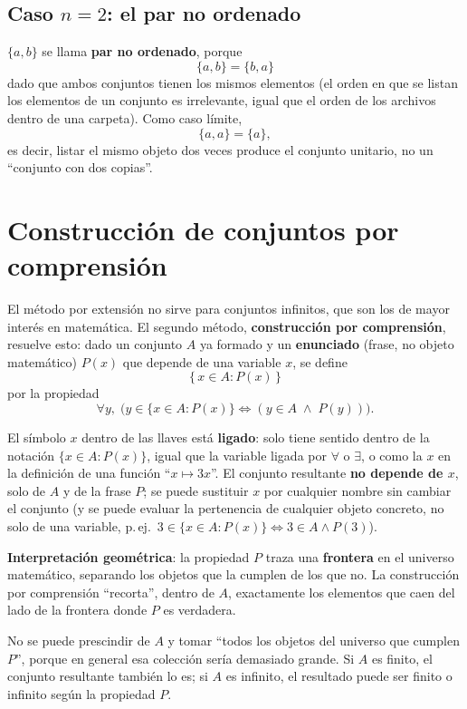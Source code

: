 \documentclass[12pt,a4paper]{article}
\begin{document}
\subsection{Caso $n=2$: el par no ordenado}

$\{a, b\}$ se llama \textbf{par no ordenado}, porque
\[
\{a, b\} = \{b, a\}
\]
dado que ambos conjuntos tienen los mismos elementos (el orden en que se
listan los elementos de un conjunto es irrelevante, igual que el orden de
los archivos dentro de una carpeta). Como caso límite,
\[
\{a, a\} = \{a\},
\]
es decir, listar el mismo objeto dos veces produce el conjunto unitario,
no un ``conjunto con dos copias''.

\section{Construcción de conjuntos por comprensión}

El método por extensión no sirve para conjuntos infinitos, que son los de
mayor interés en matemática. El segundo método, \textbf{construcción por
comprensión}, resuelve esto: dado un conjunto $A$ ya formado y un
\textbf{enunciado} (frase, no objeto matemático) $P(x)$ que depende de una
variable $x$, se define
\[
\{\, x \in A : P(x) \,\}
\]
por la propiedad
\[
\forall y,\; \big(y \in \{x \in A : P(x)\} \iff (y \in A \;\wedge\; P(y))\big).
\]

\begin{notebox}
El símbolo $x$ dentro de las llaves está \textbf{ligado}: solo tiene
sentido dentro de la notación $\{x \in A : P(x)\}$, igual que la variable
ligada por $\forall$ o $\exists$, o como la $x$ en la definición de una
función ``$x \mapsto 3x$''. El conjunto resultante \textbf{no depende de
$x$}, solo de $A$ y de la frase $P$; se puede sustituir $x$ por cualquier
nombre sin cambiar el conjunto (y se puede evaluar la pertenencia de
cualquier objeto concreto, no solo de una variable, p.\,ej.\ $3 \in \{x
\in A: P(x)\} \iff 3 \in A \wedge P(3)$).
\end{notebox}

\textbf{Interpretación geométrica}: la propiedad $P$ traza una
\textbf{frontera} en el universo matemático, separando los objetos que la
cumplen de los que no. La construcción por comprensión ``recorta'', dentro
de $A$, exactamente los elementos que caen del lado de la frontera donde
$P$ es verdadera.



\begin{notebox}
No se puede prescindir de $A$ y tomar ``todos los objetos del universo que
cumplen $P$'', porque en general esa colección sería demasiado grande. Si
$A$ es finito, el conjunto resultante también lo es; si $A$ es infinito,
el resultado puede ser finito o infinito según la propiedad $P$.
\end{notebox}
\end{document}

